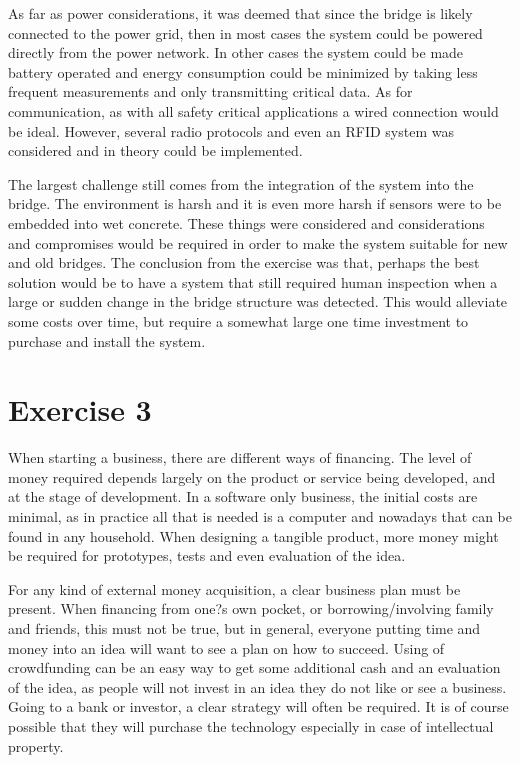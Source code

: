 \documentclass[english,12pt,a4paper,pdftex,elec,utf8]{aaltothesis}
\begin{document}
	As far as power considerations, it was deemed that since the bridge is likely connected to the power grid, then in most cases the system could be powered directly from the power network. In other cases the system could be made battery operated and energy consumption could be minimized by taking less frequent measurements and only transmitting critical data. As for communication, as with all safety critical applications a wired connection would be ideal. However, several radio protocols and even an RFID system was considered and in theory could be implemented. 
	
	The largest challenge still comes from the integration of the system into the bridge. The environment is harsh and it is even more harsh if sensors were to be embedded into wet concrete. These things were considered and considerations and compromises would be required in order to make the system suitable for new and old bridges. The conclusion from the exercise was that, perhaps the best solution would be to have a system that still required human inspection when a large or sudden change in the bridge structure was detected. This would alleviate some costs over time, but require a somewhat large one time investment to purchase and install  the system. 
	
	


\newpage


\section*{Exercise 3}

	When starting a business, there are different ways of financing. The level of money required depends largely on the product or service being developed, and at the stage of development. In a software only business, the initial costs are minimal, as in practice all that is needed is a computer and nowadays that can be found in any household. When designing a tangible product, more money might be required for prototypes, tests and even evaluation of the idea. 

	For any kind of external money acquisition, a clear business plan must be present. When financing from one?s own pocket, or borrowing/involving family and friends, this must not be true, but in general, everyone putting time and money into an idea will want to see a plan on how to succeed. Using of crowdfunding can be an easy way to get some additional cash and an evaluation of the idea, as people will not invest in an idea they do not like or see a business. Going to a bank or investor, a clear strategy will often be required. It is of course possible that they will purchase the technology especially in case of intellectual property. 
\end{document}

